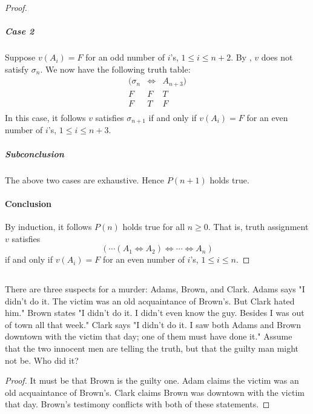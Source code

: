 \documentclass{report}
\begin{document}
\begin{proof}
      \subparagraph{Case 2}%

        Suppose $v(A_i) = F$ for an odd number of $i$'s, $1 \leq i \leq n + 2$.
        By , $v$ does not satisfy $\sigma_n$.
        We now have the following truth table:
          $$\begin{array}{s|e|s}
            (\sigma_n & \Leftrightarrow & A_{n+3}) \\
            \hline
            F & F & T \\
            F & T & F \\
          \end{array}$$
        In this case, it follows $v$ satisfies $\sigma_{n+1}$ if and only if
          $v(A_i) = F$ for an even number of $i$'s, $1 \leq i \leq n + 3$.

      \subparagraph{Subconclusion}%

        The above two cases are exhaustive.
        Hence $P(n + 1)$ holds true.

    \paragraph{Conclusion}%

      By induction, it follows $P(n)$ holds true for all $n \geq 0$.
      That is, truth assignment $v$ satisfies
        $$(\cdots (A_1 \Leftrightarrow A_2)
          \Leftrightarrow \cdots \Leftrightarrow A_n)$$
        if and only if $v(A_i) = F$ for an even number of $i$'s,
        $1 \leq i \leq n$.

  \end{proof}

\subsection{}%

  There are three suspects for a murder: Adams, Brown, and Clark.
  Adams says "I didn't do it. The victim was an old acquaintance of Brown's.
    But Clark hated him."
  Brown states "I didn't do it. I didn't even know the guy. Besides I was out of
    town all that week."
  Clark says "I didn't do it. I saw both Adams and Brown downtown with the
    victim that day; one of them must have done it."
  Assume that the two innocent men are telling the truth, but that the guilty
    man might not be.
  Who did it?

  \begin{proof}
    It must be that Brown is the guilty one.
    Adam claims the victim was an old acquaintance of Brown's.
    Clark claims Brown was downtown with the victim that day.
    Brown's testimony conflicts with both of these statements.
  \end{proof}
\end{document}
